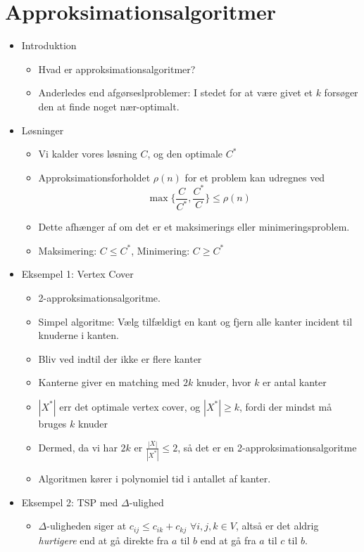 \section*{Approksimationsalgoritmer}
\begin{itemize}
	\item Introduktion
	      \begin{itemize}
		      \item Hvad er approksimationsalgoritmer?
		      \item Anderledes end afgørseslproblemer: I stedet for at være givet et $k$ forsøger den at finde noget nær-optimalt.
	      \end{itemize}
	\item Løsninger
	      \begin{itemize}
		      \item Vi kalder vores løsning $C$, og den optimale $C^{*}$
		      \item Approksimationsforholdet \(\rho(n)\) for et problem kan udregnes ved \[ \max \{ \frac{C}{C^{*}}, \frac{C^{*}}{C} \} \le \rho(n)\]
		      \item Dette afhænger af om det er et maksimerings eller minimeringsproblem.
		      \item Maksimering: $C \le C^{*}$, Minimering: $C \ge C^{*}$
	      \end{itemize}
	\item Eksempel 1: Vertex Cover
	      \begin{itemize}
		      \item 2-approksimationsalgoritme.
		      \item Simpel algoritme: Vælg tilfældigt en kant og fjern alle kanter incident til knuderne i kanten.
		      \item Bliv ved indtil der ikke er flere kanter
		      \item Kanterne giver en matching med $2k$ knuder, hvor $k$ er antal kanter
		      \item $|X^{*}|$ err det optimale vertex cover, og $|X^{*}| \ge k$, fordi der mindst må bruges $k$ knuder
		      \item Dermed, da vi har $2k$ er $\frac{|X|}{|X^{*}|} \le 2$, så det er en 2-approksimationsalgoritme
		      \item Algoritmen kører i polynomiel tid i antallet af kanter.
	      \end{itemize}
	\item Eksempel 2: TSP med $\Delta$-ulighed
	      \begin{itemize}
		      \item \(\Delta\)-uligheden siger at $c_{ij} \le c_{ik} + c_{kj}$ $\forall i,j,k \in V$, altså er det aldrig \textit{hurtigere} end at gå direkte fra $a$ til $b$ end at gå fra $a$ til $c$ til $b$.

\end{itemize}
\end{itemize}
